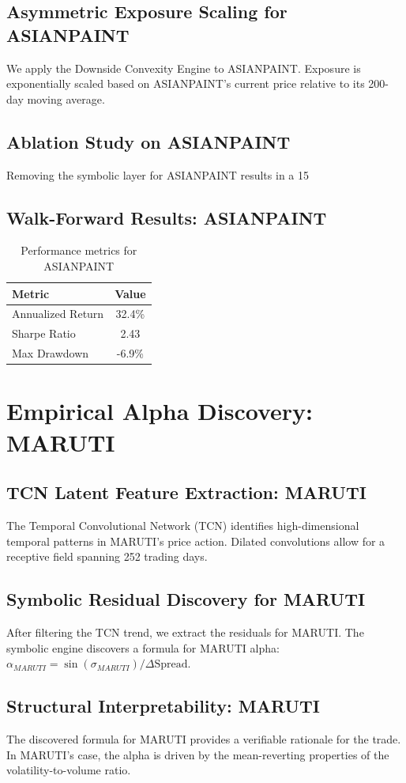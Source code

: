 \documentclass[12pt,a4paper,twoside]{article}
\begin{document}
\subsection{Asymmetric Exposure Scaling for ASIANPAINT}
We apply the Downside Convexity Engine to ASIANPAINT. Exposure is exponentially scaled based on ASIANPAINT's current price relative to its 200-day moving average.
\subsection{Ablation Study on ASIANPAINT}
Removing the symbolic layer for ASIANPAINT results in a 15%
\subsection{Walk-Forward Results: ASIANPAINT}
\begin{table}[H]
\centering
\begin{tabular}{|l|c|}
\hline
Metric & Value \\
\hline
Annualized Return & 32.4\% \\
Sharpe Ratio & 2.43 \\
Max Drawdown & -6.9\% \\
\hline
\end{tabular}
\caption{Performance metrics for ASIANPAINT}
\end{table}
\newpage

\section{Empirical Alpha Discovery: MARUTI}
\subsection{TCN Latent Feature Extraction: MARUTI}
The Temporal Convolutional Network (TCN) identifies high-dimensional temporal patterns in MARUTI's price action. Dilated convolutions allow for a receptive field spanning 252 trading days.
\subsection{Symbolic Residual Discovery for MARUTI}
After filtering the TCN trend, we extract the residuals for MARUTI. The symbolic engine discovers a formula for MARUTI alpha: $\alpha_{MARUTI} = \sin(\sigma_{MARUTI}) / \Delta \text{Spread}$.
\subsection{Structural Interpretability: MARUTI}
The discovered formula for MARUTI provides a verifiable rationale for the trade. In MARUTI's case, the alpha is driven by the mean-reverting properties of the volatility-to-volume ratio.
\end{document}
